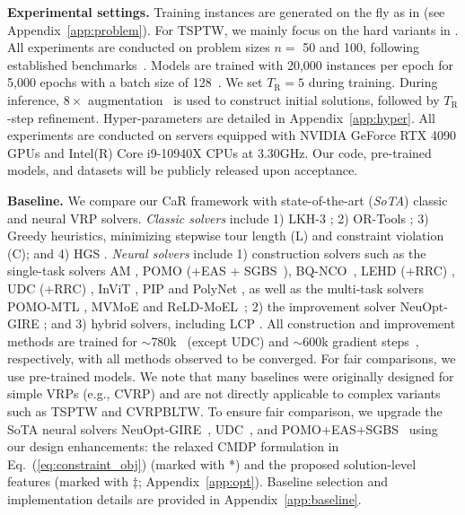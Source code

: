 \documentclass{article} %
\begin{document}
\textbf{Experimental settings.} Training instances are generated on the fly as in \citep{zhou2024mvmoe,bi2024learning} (see Appendix~\ref{app:problem}). 
For TSPTW, we mainly focus on the hard variants in \citep{bi2024learning}. 
All experiments are conducted on problem sizes $n=$ 50 and 100, following established benchmarks~\citep{kool2018attention, wu2021learning}. Models are trained with 20,000 instances per epoch for 5,000 epochs with a batch size of 128~\citep{zhou2024mvmoe}.  We set $T_{\text{R}}=5$ during training. During inference, 
\(8\times\) augmentation~\citep{kwon2020pomo} is used to construct initial solutions, followed by \(T_{\text{R}}\)-step refinement. Hyper-parameters are detailed in Appendix~\ref{app:hyper}. 
All experiments are conducted on servers equipped with NVIDIA GeForce RTX 4090 GPUs and Intel(R) Core i9-10940X CPUs at 3.30GHz. 
Our code, pre-trained models, and datasets will be publicly released upon acceptance.

\textbf{Baseline.} We compare our CaR framework with state-of-the-art (\textit{SoTA}) classic and neural VRP solvers. \emph{Classic solvers} include 1) LKH-3 \citep{lkh3}; 2) OR-Tools \citep{ortools_routing}; 3) Greedy heuristics, {minimizing stepwise tour length (L) and constraint violation (C)}; and 4) HGS \citep{vidal2012hybrid}. \emph{Neural solvers} include 1) construction solvers such as the single-task solvers AM \citep{kool2018attention}, POMO \citep{kwon2020pomo} (+EAS \citep{hottung2022efficient} + SGBS~\citep{choo2022simulation}), BQ-NCO~\citep{drakulic2023bq}, LEHD (+RRC) \citep{luo2023neural}, UDC (+RRC) \citep{zheng2024udc}, InViT \citep{fanginvit}, PIP \citep{bi2024learning} and PolyNet \citep{hottung2025polynet}, as well as the multi-task solvers 
POMO-MTL \citep{liu2024multi}, MVMoE \citep{zhou2024mvmoe} and ReLD-MoEL~\citep{huang2025rethinking}; 2) the improvement solver NeuOpt-GIRE \citep{ma2023learning}; and 3) hybrid solvers, including LCP \citep{Kim2021LearningCP}. All construction and improvement methods are trained for $\sim$780k~\citep{zhou2024mvmoe} (except UDC) and $\sim$600k gradient steps~\citep{ma2023learning}, respectively, with all methods observed to be converged. For fair comparisons, we use pre-trained models.
{We note that many baselines were originally designed for simple VRPs (e.g., CVRP) and are not directly applicable to complex variants such as TSPTW and CVRPBLTW. To ensure fair comparison, we upgrade the SoTA neural solvers NeuOpt-GIRE~\citep{ma2023learning}, UDC~\citep{zheng2024udc}, and POMO+EAS+SGBS~\citep{choo2022simulation} using our design enhancements: the relaxed CMDP formulation in Eq.~(\ref{eq:constraint_obj}) (marked with *) and the proposed solution-level features (marked with \( \ddagger \); Appendix~\ref{app:opt}). Baseline selection and implementation details are provided in Appendix~\ref{app:baseline}.}
\end{document}

